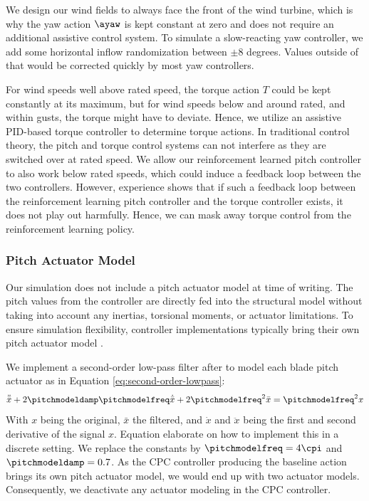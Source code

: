 We design our wind fields to always face the front of the wind turbine, which is why the yaw action $\ayaw$ is kept constant at zero and does not require an additional assistive control system. To simulate a slow-reacting yaw controller, we add some horizontal inflow randomization between $\pm8$ degrees. Values outside of that would be corrected quickly by most yaw controllers.

For wind speeds well above rated speed, the torque action $T$ could be kept constantly at its maximum, but for wind speeds below and around rated, and within gusts, the torque might have to deviate. Hence, we utilize an assistive PID-based torque controller to determine torque actions. In traditional control theory, the pitch and torque control systems can not interfere as they are switched over at rated speed. We allow our reinforcement learned pitch controller to also work below rated speeds, which could induce a feedback loop between the two controllers. However, experience shows that if such a feedback loop between the reinforcement learning pitch controller and the torque controller exists, it does not play out harmfully. Hence, we can mask away torque control from the reinforcement learning policy.

\subsubsection{Pitch Actuator Model}
\label{section:approach-actuator-model}

Our simulation does not include a pitch actuator model at time of writing. The pitch values from the controller are directly fed into the structural model without taking into account any inertias, torsional moments, or actuator limitations. To ensure simulation flexibility, controller implementations typically bring their own pitch actuator model \cite{perez-beckerImplementationValidationAdvanced2021} \cite{hansenBasicDTUWind2013}. 

We implement a second-order low-pass filter after \citet[Appendix B.2]{hansenBasicDTUWind2013} to model each blade pitch actuator as in Equation \ref{eq:second-order-lowpass}:
\begin{equation}
  \ddot{\bar{x}} + 2 \pitchmodeldamp \pitchmodelfreq \dot{\bar{x}} + 2 {\pitchmodelfreq}^2 \bar{x} = {\pitchmodelfreq}^2 x
  \label{eq:second-order-lowpass}
\end{equation}
With $x$ being the original, $\bar{x}$ the filtered, and $\dot{x}$ and $\ddot{x}$ being the first and second derivative of the signal $x$. Equation \cite[B.7, B.8]{hansenBasicDTUWind2013} elaborate on how to implement this in a discrete setting. We replace the constants by $\pitchmodelfreq = 4\cpi$ and $\pitchmodeldamp = 0.7$. As the \ac{CPC} controller producing the baseline action brings its own pitch actuator model, we would end up with two actuator models. Consequently, we deactivate any actuator modeling in the \ac{CPC} controller.

